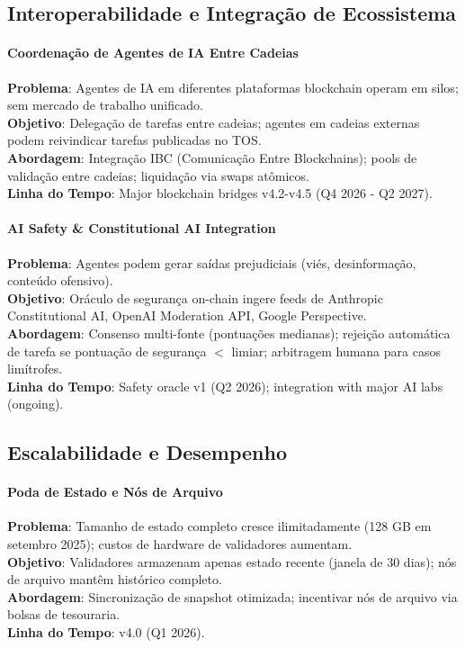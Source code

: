 \documentclass[11pt]{article}
\begin{document}
\begin{itemize}[noitemsep]
\begin{itemize}[noitemsep]
\begin{itemize}[noitemsep]
\subsection{Interoperabilidade e Integração de Ecossistema}

\paragraph{Coordenação de Agentes de IA Entre Cadeias}
\textbf{Problema}: Agentes de IA em diferentes plataformas blockchain operam em silos; sem mercado de trabalho unificado.\\
\textbf{Objetivo}: Delegação de tarefas entre cadeias; agentes em cadeias externas podem reivindicar tarefas publicadas no TOS.\\
\textbf{Abordagem}: Integração IBC (Comunicação Entre Blockchains); pools de validação entre cadeias; liquidação via swaps atômicos.\\
\textbf{Linha do Tempo}: Major blockchain bridges v4.2-v4.5 (Q4 2026 - Q2 2027).

\paragraph{AI Safety \& Constitutional AI Integration}
\textbf{Problema}: Agentes podem gerar saídas prejudiciais (viés, desinformação, conteúdo ofensivo).\\
\textbf{Objetivo}: Oráculo de segurança on-chain ingere feeds de Anthropic Constitutional AI, OpenAI Moderation API, Google Perspective.\\
\textbf{Abordagem}: Consenso multi-fonte (pontuações medianas); rejeição automática de tarefa se pontuação de segurança $<$ limiar; arbitragem humana para casos limítrofes.\\
\textbf{Linha do Tempo}: Safety oracle v1 (Q2 2026); integration with major AI labs (ongoing).

\subsection{Escalabilidade e Desempenho}

\paragraph{Poda de Estado e Nós de Arquivo}
\textbf{Problema}: Tamanho de estado completo cresce ilimitadamente (128 GB em setembro 2025); custos de hardware de validadores aumentam.\\
\textbf{Objetivo}: Validadores armazenam apenas estado recente (janela de 30 dias); nós de arquivo mantêm histórico completo.\\
\textbf{Abordagem}: Sincronização de snapshot otimizada; incentivar nós de arquivo via bolsas de tesouraria.\\
\textbf{Linha do Tempo}: v4.0 (Q1 2026).


\end{itemize}
\end{itemize}
\end{itemize}
\end{document}
